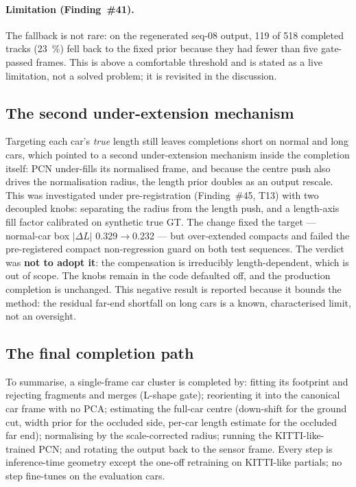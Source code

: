 \paragraph{Limitation (Finding~\#41).} The fallback is not rare: on the
regenerated seq-08 output, \num{119} of \num{518} completed tracks
(\SI{23}{\percent}) fell back to the fixed prior because they had fewer than five
gate-passed frames. This is above a comfortable threshold and is stated as a live
limitation, not a solved problem; it is revisited in the discussion.

\subsection{The second under-extension mechanism}
\label{sec:completion-step1c}

Targeting each car's \emph{true} length still leaves completions short on normal
and long cars, which pointed to a second under-extension mechanism inside the
completion itself: PCN under-fills its normalised frame, and because the centre
push also drives the normalisation radius, the length prior doubles as an output
rescale. This was investigated under pre-registration (Finding~\#45, T13) with
two decoupled knobs: separating the radius from the length push, and a
length-axis fill factor calibrated on synthetic true GT. The change fixed the
target --- normal-car box $|\Delta L|$ \num{0.329}$\to$\num{0.232} --- but
over-extended compacts and failed the pre-registered compact non-regression guard
on both test sequences. The verdict was \textbf{not to adopt it}: the compensation is
irreducibly length-dependent, which is out of scope. The knobs remain in the code
defaulted off, and the production completion is unchanged. This negative result is
reported because it bounds the method: the residual far-end shortfall on long cars
is a known, characterised limit, not an oversight.

\subsection{The final completion path}
\label{sec:completion-summary}

To summarise, a single-frame car cluster is completed by: fitting its footprint
and rejecting fragments and merges (L-shape gate); reorienting it into the
canonical car frame with no PCA; estimating the full-car centre (down-shift for
the ground cut, width prior for the occluded side, per-car length estimate for
the occluded far end); normalising by the scale-corrected radius; running the
KITTI-like-trained PCN; and rotating the output back to the sensor frame. Every
step is inference-time geometry except the one-off retraining on KITTI-like
partials; no step fine-tunes on the evaluation cars.

